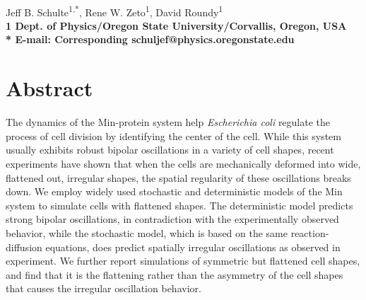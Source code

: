 \documentclass[10pt,letterpaper]{article}
\date{}
\begin{document}
\vspace*{0.35in}

\begin{flushleft}
{\Large
\textbf{}
}
\newline
\\
Jeff B. Schulte\textsuperscript{1,*},
Rene W. Zeto\textsuperscript{1},
David Roundy\textsuperscript{1}
\\
\bf{1} Dept. of Physics/Oregon State University/Corvallis, Oregon, USA
\\

% 
%

* E-mail: Corresponding schuljef@physics.oregonstate.edu
\end{flushleft}
\section*{Abstract}
  The dynamics of the Min-protein system help \emph{Escherichia coli}
  regulate the process of cell division by identifying the center of
  the cell.  While this system usually exhibits robust bipolar
  oscillations in a variety of cell shapes, recent experiments have
  shown that when the cells are mechanically deformed into wide,
  flattened out, irregular shapes, the spatial regularity of these
  oscillations breaks down. We employ widely used stochastic and
  deterministic models of the Min system to simulate cells with flattened
  shapes.  The deterministic model predicts strong bipolar
  oscillations, in contradiction with the experimentally observed
  behavior, while the stochastic model, which is based on the same
  reaction-diffusion equations, does predict spatially irregular
  oscillations as observed in experiment.  We further report
  simulations of symmetric but flattened cell shapes, and find that it
  is the flattening rather than the asymmetry of the cell shapes that
  causes the irregular oscillation behavior.

\end{document}
